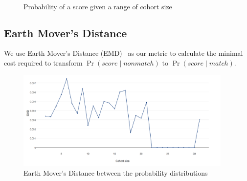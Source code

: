 \begin{figure}[ht]
  \centering
  \label{fig:otago_pscohort}\\ %
  \caption{Probability of a score given a range of cohort size}
  \label{fig:otago_psnoncohort} %
\end{figure}

\subsection{Earth Mover's Distance}

We use Earth Mover's Distance (EMD)~\cite{emd00} as our metric to calculate the
minimal cost required to transform $\Pr{(score \mid nonmatch)}$ to $\Pr{(score \mid match)}$.

\begin{figure}[ht]
  \centering
  \includegraphics[width=0.95\textwidth]{dataset/grand/emd}
  \caption{Earth Mover's Distance between the probability distributions}
  \label{fig:grand_emd} %
\end{figure}

